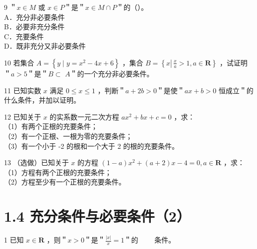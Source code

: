 \documentclass[10pt]{article}
\begin{document}
9 ＂\(x \in M\) 或 \(x \in P\)＂是＂\(x \in M \cap P\)＂的（）。\\
A．充分非必要条件\\
B．必要非充分条件\\
C．充要条件\\
D．既非充分又非必要条件

10 若集合 \(A=\left\{y \mid y=x^{2}-4 x+6\right\}\) ，集合 \(B=\left\{x \left\lvert\, \frac{x}{a}>1\right., a \in \mathbf{R}\right\}\) ，试证明＂\(a>5\)＂是＂\(B \subset\) \(A\)＂的一个充分非必要条件。

11 已知实数 \(x\) 满足 \(0 \leqslant x \leqslant 1\) ，判断＂\(a+2 b>0\)＂是使＂\(a x+b>0\) 恒成立＂的什么条件，并加以证明。

12 已知关于 \(x\) 的实系数一元二次方程 \(a x^{2}+b x+c=0\) ，求：\\
（1）有两个正根的充要条件；\\
（2）有一个正根、一根为零的充要条件；\\
（3）有一个小于 -2 的根和一个大于 2 的根的充要条件。

13 （选做）已知关于 \(x\) 的方程 \((1-a) x^{2}+(a+2) x-4=0, a \in \mathbf{R}\) ，求：\\
（1）方程有两个正根的充要条件；\\
（2）方程至少有一个正根的充要条件。

\section*{1.4 充分条件与必要条件（2）}
1 已知 \(x \in \mathbf{R}\) ，则＂\(x>0\)＂是＂\(\frac{|x|}{x}=1\)＂的 \(\qquad\)条件。
\end{document}
